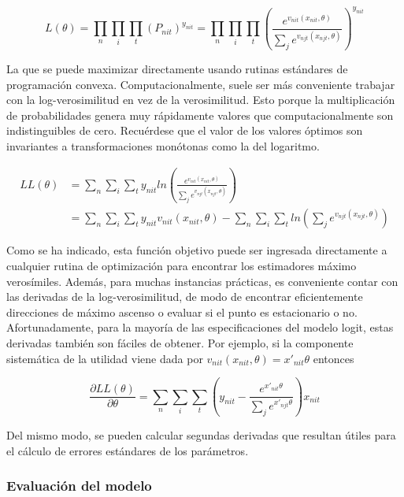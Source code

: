 \documentclass[
]{book}
\begin{document}
\begin{equation}
L(\theta) = \prod_n\prod_i\prod_t (P_{nit})^{y_{nit}} =  \prod_n\prod_i\prod_t \left(\frac{e^{v_{nit}(x_{nit},\theta)}}{\sum_j e^{v_{njt}(x_{njt},\theta)}}\right)^{y_{nit}}
\label{eq:likelihood}
\end{equation}

La que se puede maximizar directamente usando rutinas estándares de programación convexa. Computacionalmente, suele ser más conveniente trabajar con la log-verosimilitud en vez de la verosimilitud. Esto porque la multiplicación de probabilidades genera muy rápidamente valores que computacionalmente son indistinguibles de cero. Recuérdese que el valor de los valores óptimos son invariantes a transformaciones monótonas como la del logaritmo.

\begin{equation}
\begin{aligned}
LL(\theta) &= \sum_n\sum_i\sum_t y_{nit} ln \left(\frac{e^{v_{nit}(x_{nit},\theta)}}{\sum_j e^{v_{njt}(x_{njt},\theta)}}\right)\\
&= \sum_n\sum_i\sum_t y_{nit}v_{nit}(x_{nit},\theta) - \sum_n\sum_i\sum_t ln \left(\sum_j e^{v_{njt}(x_{njt},\theta)}\right)
\end{aligned}
\label{eq:loglikelihood}
\end{equation}

Como se ha indicado, esta función objetivo puede ser ingresada directamente a cualquier rutina de optimización para encontrar los estimadores máximo verosímiles. Además, para muchas instancias prácticas, es conveniente contar con las derivadas de la log-verosimilitud, de modo de encontrar eficientemente direcciones de máximo ascenso o evaluar si el punto es estacionario o no. Afortunadamente, para la mayoría de las especificaciones del modelo logit, estas derivadas también son fáciles de obtener. Por ejemplo, si la componente sistemática de la utilidad viene dada por \(v_{nit}(x_{nit}, \theta) = x'_{nit}\theta\) entonces

\begin{equation}
\frac{\partial LL(\theta)}{\partial \theta} = \sum_n\sum_i\sum_t \left(y_{nit} - \frac{e^{x'_{nit}\theta}}{\sum_j e^{x'_{njt}\theta}}\right)x_{nit}
\label{eq:gradient}
\end{equation}

Del mismo modo, se pueden calcular segundas derivadas que resultan útiles para el cálculo de errores estándares de los parámetros.

\subsubsection*{Evaluación del modelo}\label{evaluaciuxf3n-del-modelo}
\end{document}
